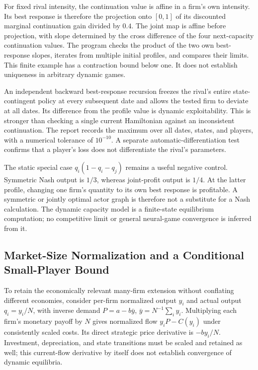 For fixed rival intensity, the continuation value is affine in a firm's own intensity. Its best response is therefore the projection onto $[0,1]$ of its discounted marginal continuation gain divided by $0.4$. The joint map is affine before projection, with slope determined by the cross difference of the four next-capacity continuation values. The program checks the product of the two own best-response slopes, iterates from multiple initial profiles, and compares their limits. This finite example has a contraction bound below one. It does not establish uniqueness in arbitrary dynamic games.

An independent backward best-response recursion freezes the rival's entire state-contingent policy at every subsequent date and allows the tested firm to deviate at all dates. Its difference from the profile value is dynamic exploitability. This is stronger than checking a single current Hamiltonian against an inconsistent continuation. The report records the maximum over all dates, states, and players, with a numerical tolerance of $10^{-10}$. A separate automatic-differentiation test confirms that a player's loss does not differentiate the rival's parameters.

The static special case $q_i(1-q_i-q_j)$ remains a useful negative control. Symmetric Nash output is $1/3$, whereas joint-profit output is $1/4$. At the latter profile, changing one firm's quantity to its own best response is profitable. A symmetric or jointly optimal actor graph is therefore not a substitute for a Nash calculation. The dynamic capacity model is a finite-state equilibrium computation; no competitive limit or general neural-game convergence is inferred from it.

\subsection{Market-Size Normalization and a Conditional Small-Player Bound}
To retain the economically relevant many-firm extension without conflating different economies, consider per-firm normalized output $y_i$ and actual output $q_i=y_i/N$, with inverse demand $P=a-b\bar y$, $\bar y=N^{-1}\sum_i y_i$. Multiplying each firm's monetary payoff by $N$ gives normalized flow $y_iP-C(y_i)$ under consistently scaled costs. Its direct strategic price derivative is $-by_i/N$. Investment, depreciation, and state transitions must be scaled and retained as well; this current-flow derivative by itself does not establish convergence of dynamic equilibria.

